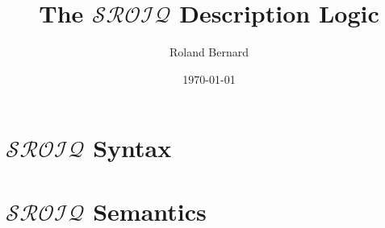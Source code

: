 \documentclass[10pt,a4paper]{article}
\title{The \texorpdfstring{$\mathcal{SROIQ}$}{SROIQ} Description Logic}
\author{Roland Bernard}
\date{\today}
\theoremstyle{plain}
\theoremstyle{definition}
\theoremstyle{remark}
\begin{document}
\maketitle

\renewcommand{\subsubsection}{\section}
\renewcommand{\paragraph}{\subsection}
\renewcommand{\cref}{}

\section{\texorpdfstring{$\mathcal{SROIQ}$}{SROIQ} Syntax} \label{sroiq-syntax}



\section{\texorpdfstring{$\mathcal{SROIQ}$}{SROIQ} Semantics} \label{sroiq-semantics}



\printbibliography
\end{document}
